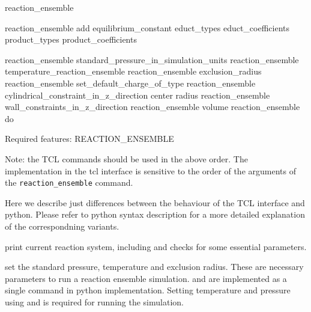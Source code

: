 \begin{essyntax}
   reaction\_ensemble

   reaction\_ensemble add equilibrium_constant  educt\_types  educt_coefficients  product\_types  product\_coefficients 
  
   reaction\_ensemble standard\_pressure\_in\_simulation\_units 
   reaction\_ensemble temperature\_reaction\_ensemble 
   reaction\_ensemble exclusion\_radius 
   reaction\_ensemble set\_default\_charge\_of\_type  
   reaction\_ensemble cylindrical\_constraint\_in\_z\_direction center   radius 
   reaction\_ensemble wall\_constraints\_in\_z\_direction  
   reaction\_ensemble volume 
   reaction\_ensemble do
            
  Required features: REACTION\_ENSEMBLE

  Note: the TCL commands should be used in the above order. 
  The implementation in the tcl interface is sensitive to the order of the arguments of the \verb!reaction_ensemble! command. 

  \end{essyntax}


Here we describe just differences between the behaviour of the TCL interface and python.
Please refer to python syntax description for a more detailed explanation of the correspondning
variants.

 print current reaction system, including and checks for some essential parameters.

   set the standard pressure, temperature and exclusion radius. These are necessary
parameters to run a reaction ensemble simulation.
  and  are implemented as a single command  in python implementation.
Setting temperature and pressure using  and  is required for running the simulation.

